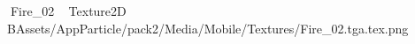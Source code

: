    Fire_02             	   Texture2D	   B   Assets/AppParticle/pack2/Media/Mobile/Textures/Fire_02.tga.tex.png